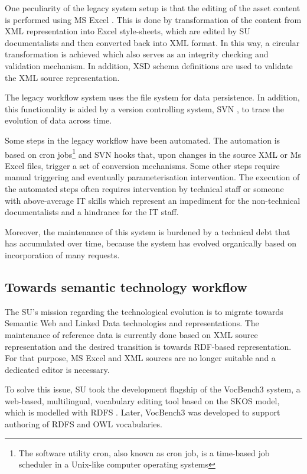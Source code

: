 	One peculiarity of the legacy system setup is that the editing of the asset content is performed using MS Excel \citep{excel}. This is done by transformation of the content from XML representation into Excel style-sheets, which are edited by SU documentalists and then converted back into XML format. In this way, a circular transformation is achieved which also serves as an integrity checking and validation mechanism. In addition, XSD \citep{xsd1.1-spec} schema definitions are used to validate the XML source representation.
	 
	The legacy workflow system uses the file system for data persistence. In addition, this functionality is aided by a version controlling system, SVN \cite{svn}, to trace the evolution of data across time.
	 
	Some steps in the legacy workflow have been automated. The automation is based on cron jobs\footnote{The software utility cron, also known as cron job, is a time-based job scheduler in a Unix-like computer operating systems} and SVN hooks that, upon changes in the source XML or Ms Excel files, trigger a set of conversion mechanisms.  Some other steps require manual triggering and eventually parameterisation intervention. The execution of the automated steps often requires intervention by technical staff or someone with above-average IT skills which represent an impediment for the non-technical documentalists and a hindrance for the IT staff.
	 
	Moreover, the maintenance of this system is burdened by a technical debt that has accumulated over time, because the system has evolved organically based on incorporation of many requests. 
	
	\subsection{Towards semantic technology workflow}
	
	The SU's mission regarding the technological evolution is to migrate towards Semantic Web and Linked Data technologies and representations. The maintenance of reference data is currently done based on XML source representation and the desired transition is towards RDF-based representation\citep{rdf11,rdf11-semantics}. For that purpose, MS Excel and XML sources are no longer suitable and a dedicated editor is necessary.
	
	To solve this issue, SU took the development flagship of the VocBench3 \citep{stellatovocbench, stellato2017towards} system, a web-based, multilingual, vocabulary editing tool based on the SKOS \citep{skos-spec} model, which is modelled with RDFS \citep{rdfs1-spec,rdfs11-spec}. Later, VocBench3 was developed to support authoring of RDFS \citep{rdfs11-spec} and OWL \citep{owl2.0} vocabularies.
	
